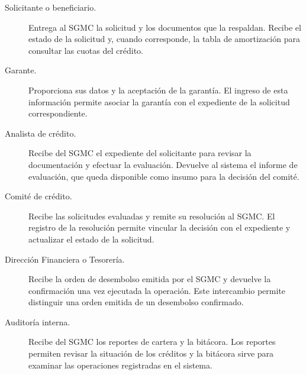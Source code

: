 \documentclass[11pt,a4paper]{article}
\begin{document}
\begin{description}
  \item[Solicitante o beneficiario.]
  Entrega al SGMC la solicitud y los documentos que la respaldan.
  Recibe el estado de la solicitud y, cuando corresponde, la tabla de
  amortización para consultar las cuotas del crédito.

  \item[Garante.]
  Proporciona sus datos y la aceptación de la garantía. El ingreso de
  esta información permite asociar la garantía con el expediente de
  la solicitud correspondiente.

  \item[Analista de crédito.]
  Recibe del SGMC el expediente del solicitante para revisar la
  documentación y efectuar la evaluación. Devuelve al sistema el
  informe de evaluación, que queda disponible como insumo para
  la decisión del comité.

  \item[Comité de crédito.]
  Recibe las solicitudes evaluadas y remite su resolución al SGMC.
  El registro de la resolución permite vincular la decisión con el
  expediente y actualizar el estado de la solicitud.

  \item[Dirección Financiera o Tesorería.]
  Recibe la orden de desembolso emitida por el SGMC y devuelve la
  confirmación una vez ejecutada la operación. Este intercambio
  permite distinguir una orden emitida de un desembolso confirmado.

  \item[Auditoría interna.]
  Recibe del SGMC los reportes de cartera y la bitácora. Los reportes
  permiten revisar la situación de los créditos y la bitácora sirve
  para examinar las operaciones registradas en el sistema.
\end{description}
\end{document}
